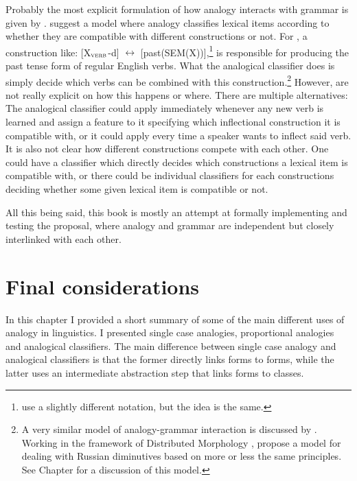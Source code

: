 Probably the most explicit formulation of how analogy interacts with grammar is given by \textcite{Bybee.2015}. \citeauthor{Bybee.2015} suggest a model where analogy classifies lexical items according to whether they are compatible with different constructions or not. For \textcite{Bybee.2015}, a construction like: [X$_{\textsc{verb}}$-d] $\leftrightarrow$ [past(SEM(X))],\footnote{\textcite{Bybee.2015} use a slightly different notation, but the idea is the same.} is responsible for producing the past tense form of regular English verbs. What the analogical classifier does is simply decide which verbs can be combined with this construction.\footnote{A very similar model of analogy-grammar interaction is discussed by \textcite{Gouskova.2015}. Working in the framework of Distributed Morphology \autocite{Halle.1993}, \textcite{Gouskova.2015} propose a model for dealing with Russian diminutives based on more or less the same principles. See Chapter  for a discussion of this model.} However, \textcite{Bybee.2015} are not really explicit on how this happens or where. There are multiple alternatives: The analogical classifier could apply immediately whenever any new verb is learned and assign a feature to it specifying which inflectional construction it is compatible with, or it could apply every time a speaker wants to inflect said verb. It is also not clear how different constructions compete with each other. One could have a classifier which directly decides which constructions a lexical item is compatible with, or there could be individual classifiers for each constructions deciding whether some given lexical item is compatible or not.

All this being said, this book is mostly an attempt at formally implementing and testing the \citeauthor{Bybee.2015} proposal, where analogy and grammar are independent but closely interlinked with each other.

\section{Final considerations}

In this chapter I provided a short summary of some of the main different uses of analogy in linguistics. I presented single case analogies, proportional analogies and analogical classifiers. The main difference between single case analogy and analogical classifiers is that the former directly links forms to forms, while the latter uses an intermediate abstraction step that links forms to classes.

